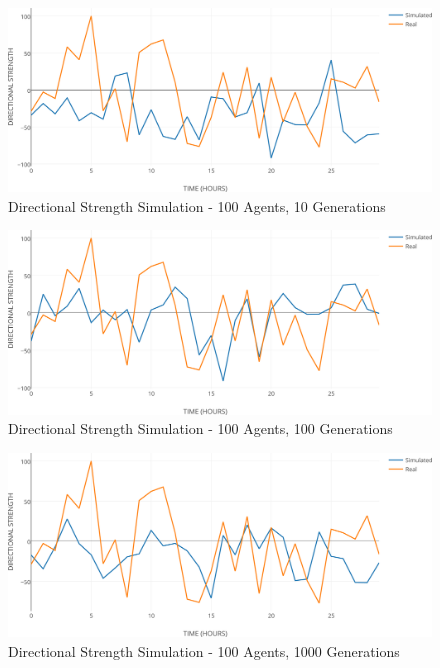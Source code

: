 \documentclass[12pt,journal,compsoc]{IEEEtran}
\begin{document}
\begin{figure}[h!]
\begin{center}
\includegraphics[width=1.00\columnwidth]{figures/ds-sim-100agents-10gen/ds-sim-100agents-10gen}
\caption{{\label{ds-prediction-10}Directional Strength Simulation - 100 Agents, 10 Generations%
}}
\end{center}
\end{figure}

\begin{figure}[h!]
\begin{center}
\includegraphics[width=1.00\columnwidth]{figures/ds-sim-100agents-100gen/ds-sim-100agents-100gen}
\caption{{\label{ds-prediction-100}Directional Strength Simulation - 100 Agents, 100 Generations%
}}
\end{center}
\end{figure}

\begin{figure}[h!]
\begin{center}
\includegraphics[width=1.00\columnwidth]{figures/ds-sim-100agents-1000gen/ds-sim-100agents-1000gen}
\caption{{\label{ds-prediction-1000}Directional Strength Simulation - 100 Agents, 1000 Generations%
}}
\end{center}
\end{figure}
\end{document}
